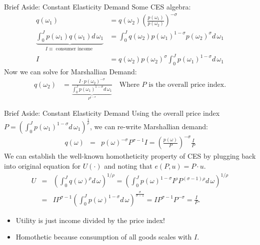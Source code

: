 \documentclass[xcolor=pdftex,dvipsnames,table,mathserif,aspectratio=169]{beamer}
\begin{document}
\begin{frame}{Brief Aside: Constant Elasticity Demand}
\small
Some CES algebra:
\begin{align*}
q(\omega_1) &= q(\omega_2) \left( \frac{p(\omega_1)}{p(\omega_2)} \right)^{-\sigma}\\
\underbrace{\int_{0}^J p(\omega_1) q(\omega_1)  d\, \omega_1}_{I \equiv \text{ consumer income }} &= \int_{0}^J q(\omega_2) p(\omega_1)^{1-\sigma} p(\omega_2)^{\sigma} d\, \omega_1\\
I &= q(\omega_2) p(\omega_2)^{\sigma}  \int_{0}^J  p(\omega_1)^{1-\sigma}  d\, \omega_1
\end{align*}
Now we can solve for Marshallian Demand:
\begin{align*}
q(\omega_2) &= \frac{I  \cdot p(\omega_2)^{-\sigma}}{\underbrace{\int_{0}^J  p(\omega_1)^{1-\sigma}  d\, \omega_1}_{P^{1-\sigma}}} \quad \text{Where $P$ is the overall price index}.
\end{align*}

\end{frame}

\begin{frame}{Brief Aside: Constant Elasticity Demand}
Using the overall price index $P =\left( \int_{0}^J  p(\omega_1)^{1-\sigma}  d\, \omega_1 \right)^{\frac{1}{\rho}}$, we can re-write Marshallian demand:
\begin{eqnarray*}
q(\omega) &=& p(\omega)^{-\sigma} P^{\sigma-1} I = \left(\frac{p(\omega)}{P}\right)^{-\sigma}  \frac{I}{P}
\end{eqnarray*}
We can establish the well-known \alert{homotheticity} property of CES by plugging back into original equation for $U(\cdot)$ and noting that $e(P,u) = P \cdot u$.
\begin{eqnarray*}
U &=&\left( \int_0^J q(\omega)^\rho d\, \omega \right)^{1/\rho}  =  \left( \int_0^J  p(\omega)^{1-\sigma} I^{\rho} P^{(\sigma-1) \rho} d\, \omega \right)^{1/\rho} \\
 &=& IP^{\sigma-1}\left( \int_0^J  p(\omega)^{1-\sigma} d\, \omega \right)^{\frac{\sigma}{\sigma-1}}  = IP^{\sigma-1} P^{-\sigma}  = \frac{I}{P}.
\end{eqnarray*}
\begin{itemize}
\item Utility is just income divided by the price index!
\item Homothetic because consumption of all goods scales with $I$.
\end{itemize}
\end{frame}
\end{document}
